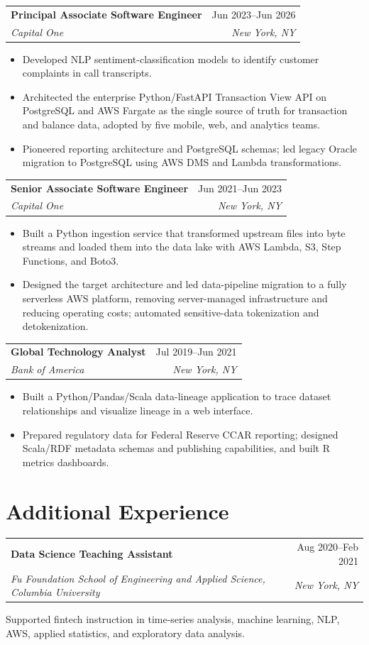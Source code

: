 \documentclass[11pt,a4paper]{article}
\makeatletter
\newcommand{\resumeentry}[4]{%
  \begin{tabularx}{\textwidth}{@{}Xr@{}}
    \textbf{#1} & \textcolor{muted}{#4} \\
    \textit{#2} & \textit{\textcolor{muted}{#3}}
  \end{tabularx}\par\vspace{-3pt}
}
\newenvironment{compactitemize}{%
  \begin{itemize}
  \setlength{\itemsep}{0pt}
  \setlength{\topsep}{1pt}
  \setlength{\parsep}{0pt}
}{\end{itemize}}
\makeatother
\begin{document}
\resumeentry{Principal Associate Software Engineer}{Capital One}{New York, NY}{Jun 2023--Jun 2026}
\begin{compactitemize}
  \item Developed NLP sentiment-classification models to identify customer complaints in call transcripts.
  \item Architected the enterprise Python/FastAPI Transaction View API on PostgreSQL and AWS Fargate as the single source of truth for transaction and balance data, adopted by five mobile, web, and analytics teams.
  \item Pioneered reporting architecture and PostgreSQL schemas; led legacy Oracle migration to PostgreSQL using AWS DMS and Lambda transformations.
\end{compactitemize}

\resumeentry{Senior Associate Software Engineer}{Capital One}{New York, NY}{Jun 2021--Jun 2023}
\begin{compactitemize}
  \item Built a Python ingestion service that transformed upstream files into byte streams and loaded them into the data lake with AWS Lambda, S3, Step Functions, and Boto3.
  \item Designed the target architecture and led data-pipeline migration to a fully serverless AWS platform, removing server-managed infrastructure and reducing operating costs; automated sensitive-data tokenization and detokenization.
\end{compactitemize}

\resumeentry{Global Technology Analyst}{Bank of America}{New York, NY}{Jul 2019--Jun 2021}
\begin{compactitemize}
  \item Built a Python/Pandas/Scala data-lineage application to trace dataset relationships and visualize lineage in a web interface.
  \item Prepared regulatory data for Federal Reserve CCAR reporting; designed Scala/RDF metadata schemas and publishing capabilities, and built R metrics dashboards.
\end{compactitemize}

\newpage
\section{Additional Experience}
\resumeentry{Data Science Teaching Assistant}{Fu Foundation School of Engineering and Applied Science, Columbia University}{New York, NY}{Aug 2020--Feb 2021}
Supported fintech instruction in time-series analysis, machine learning, NLP, AWS, applied statistics, and exploratory data analysis.
\end{document}
